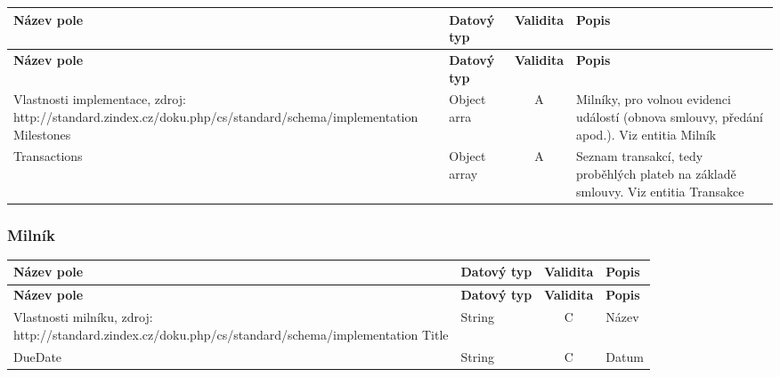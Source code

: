 \begin{center}
\begin{longtable}{lp{20mm}cp{65mm}}
\label{grid_mlmmh} \\
\multicolumn{1}{l}{\textbf{Název pole}} & 
\multicolumn{1}{l}{\textbf{Datový typ}} & 
\multicolumn{1}{l}{\textbf{Validita}} & 
\multicolumn{1}{l}{\textbf{Popis}} \\ \hline 
\endfirsthead
\multicolumn{1}{l}{\textbf{Název pole}} & 
\multicolumn{1}{l}{\textbf{Datový typ}} & 
\multicolumn{1}{l}{\textbf{Validita}} & 
\multicolumn{1}{l}{\textbf{Popis}} \\ \hline 
\hline
\endhead
\endfoot
\caption{Vlastnosti implementace, zdroj:\\http://standard.zindex.cz/doku.php/cs/standard/schema/implementation}
\endlastfoot
\rowcolor{validateA}Milestones & Object arra & A & Milníky, pro volnou evidenci událostí (obnova smlouvy, předání apod.). Viz entitia Milník \\
\rowcolor{validateA}Transactions & Object array & A & Seznam transakcí, tedy proběhlých plateb na základě smlouvy. Viz entitia Transakce \\
\end{longtable}
\end{center}

\subsubsection*{Milník}

\begin{center}
\begin{longtable}{lp{20mm}cp{65mm}}
\label{grid_mlmmh} \\
\multicolumn{1}{l}{\textbf{Název pole}} & 
\multicolumn{1}{l}{\textbf{Datový typ}} & 
\multicolumn{1}{l}{\textbf{Validita}} & 
\multicolumn{1}{l}{\textbf{Popis}} \\ \hline 
\endfirsthead
\multicolumn{1}{l}{\textbf{Název pole}} & 
\multicolumn{1}{l}{\textbf{Datový typ}} & 
\multicolumn{1}{l}{\textbf{Validita}} & 
\multicolumn{1}{l}{\textbf{Popis}} \\ \hline 
\hline
\endhead
\endfoot
\caption{Vlastnosti milníku, zdroj:\\http://standard.zindex.cz/doku.php/cs/standard/schema/implementation}
\endlastfoot
\rowcolor{validateC}Title & String & C & Název \\
\rowcolor{validateC}DueDate & String & C & Datum \\
\end{longtable}
\end{center}

